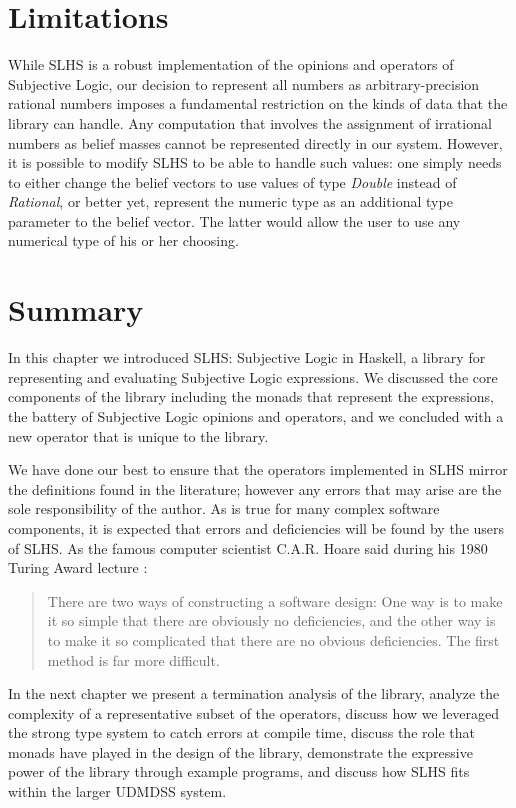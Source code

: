 \documentclass[thesis.tex]{subfiles}
\begin{document}
\section{Limitations}
\label{sec:limitations}

While SLHS is a robust implementation of the opinions and operators of Subjective Logic,
our decision to represent all numbers as arbitrary-precision rational numbers imposes a
fundamental restriction on the kinds of data that the library can handle. Any computation
that involves the assignment of irrational numbers as belief masses cannot be represented
directly in our system. However, it is possible to modify SLHS to be able to handle such
values: one simply needs to either change the belief vectors to use values of type
\emph{Double} instead of \emph{Rational}, or better yet, represent the numeric type as
an additional type parameter to the belief vector. The latter would allow the user to
use any numerical type of his or her choosing.




%
%



\section{Summary}

In this chapter we introduced SLHS: Subjective Logic in Haskell, a library
for representing and evaluating Subjective Logic expressions. We discussed the core
components of the library including the monads that represent the expressions, the
battery of Subjective Logic opinions and operators, and we concluded with a new operator
that is unique to the library.

We have done our best to ensure that the operators implemented in SLHS mirror the definitions
found in the literature; however any errors that may arise are the sole responsibility of the author.
As is true for many complex software components, it is expected that errors and deficiencies will
be found by the users of SLHS. As the famous computer scientist C.A.R. Hoare said during his 1980 Turing Award lecture \cite{hoare19811980}:

\begin{quote}
There are two ways of constructing a software design: One way is to make it so simple that there are
obviously no deficiencies, and the other way is to make it so complicated that there are no obvious
deficiencies. The first method is far more difficult.
\end{quote}

In the next chapter we present a termination
analysis of the library, analyze the complexity of a representative subset of the operators, discuss
how we leveraged the strong type system to catch errors at compile time, discuss the role that monads have played in the design of the library,
demonstrate the expressive power of the library through example programs, and discuss how SLHS fits within the larger UDMDSS system.
\end{document}
